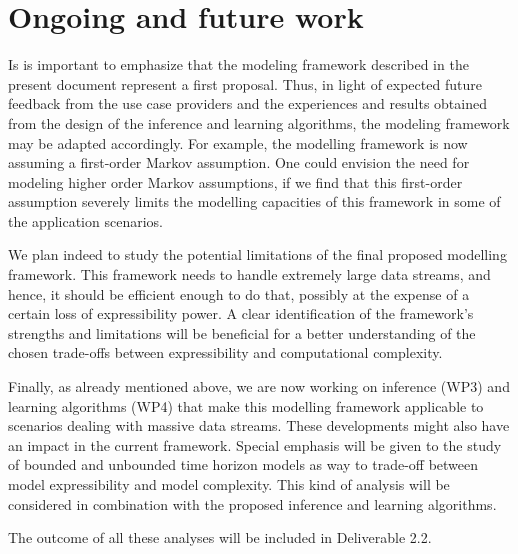 \section{Ongoing and future work}\label{section:conclusions}

Is is important to emphasize that the modeling framework described in the present document represent a first
proposal. Thus, in light of expected future feedback from the use case providers and the experiences and results obtained from the design of
the inference and learning algorithms, the modeling framework may be adapted accordingly. For example, the modelling
framework is now assuming a first-order Markov assumption. One could envision the need for modeling higher order Markov assumptions, if we find that this first-order assumption severely limits the modelling capacities of this framework in some of the application scenarios. 

We plan indeed to study the potential limitations of the final proposed modelling framework. This framework needs to handle extremely large data streams, and hence, it should be efficient enough to do that, possibly at the expense of a certain loss of expressibility power. A clear identification of the framework's strengths and limitations will be beneficial for a better understanding of the chosen trade-offs between expressibility and computational complexity.

Finally, as already mentioned above,  we are now working on inference (WP3) and learning algorithms (WP4) that make this modelling framework applicable to scenarios dealing with massive data streams. These developments might also have an impact in the current framework. Special emphasis will be given to the study of bounded and unbounded time horizon models as way to trade-off between model expressibility and model complexity. This kind of analysis will be considered in combination with the proposed inference and learning algorithms.

The outcome of all these analyses will be included in Deliverable 2.2.
